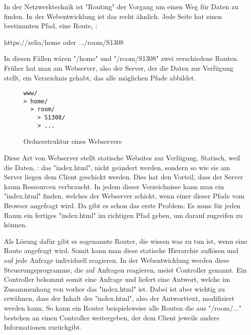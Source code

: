 \label{sec:csrouter}


In der Netzwerktechnik ist "Routing" der Vorgang um einen Weg für Daten zu finden. In der Webentwicklung ist das recht ähnlich. Jede Seite hat einen bestimmten Pfad, eine Route, \zb:

{\ttfamily https://zelia/home} oder {\ttfamily .../room/S1308}

In diesen Fällen wären "{\ttfamily /home}" und "{\ttfamily /room/S1308}" zwei verschiedene Routen. Früher hat man am Webserver, also der Server, der die Daten zur Verfügung stellt, ein Verzeichnis gehabt, das alle möglichen Pfade abbildet.

\begin{figure}[H]
    \begin{lstlisting}
www/
> home/
  > room/
    > S1308/
    > ...
    \end{lstlisting}
    \caption{Ordnerstruktur eines Webservers}
\end{figure}

Diese Art von Webserver stellt statische Websites zur Verfügung. Statisch, weil die Daten, \zb: das "{\ttfamily index.html}", nicht geändert werden, sondern so wie sie am Server liegen dem Client geschickt werden. Dies hat den Vorteil, dass der Server kaum Ressourcen verbraucht. In jedem dieser Verzeichnisse kann man ein "{\ttfamily index.html}" finden, welches der Webserver schickt, wenn einer dieser Pfade vom Browser angefragt wird. Da gibt es schon das erste Problem: Es muss für jeden Raum ein fertiges "{\ttfamily index.html}" im richtigen Pfad geben, um darauf zugreifen zu können.

Als Lösung dafür gibt es sogenannte Router, die wissen was zu tun ist, wenn eine Route angefragt wird. Somit kann man diese statische Hierarchie auflösen und auf jede Anfrage individuell reagieren. In der Webentwicklung werden diese Steuerungsprogramme, die auf Anfragen reagieren, meist Controller genannt. Ein Controller bekommt somit eine Anfrage und liefert eine Antwort, welche im Zusammenhang von vorher das "{\ttfamily index.html}" ist. Dabei ist aber wichtig zu erwähnen, dass der Inhalt des "{\ttfamily index.html}", also der Antworttext, modifiziert werden kann. So kann ein Router beispielsweise alle Routen die aus "{\ttfamily /room/...}" bestehen an einen Controller weitergeben, der dem Client jeweils andere Informationen zurückgibt.

